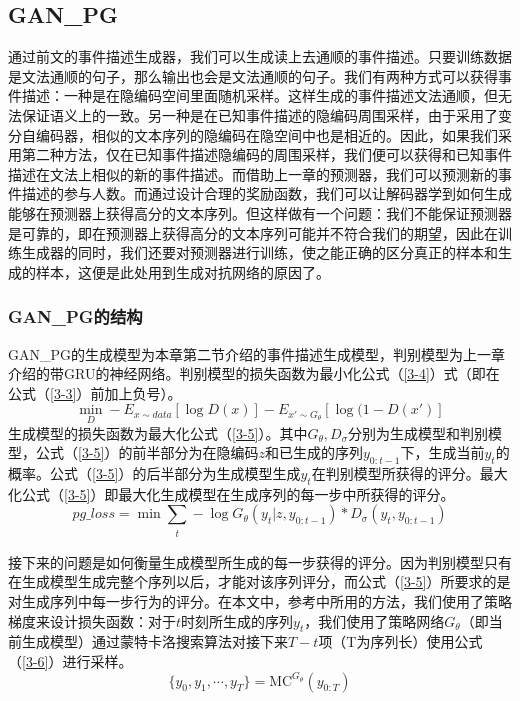 \subsection{GAN\_PG}
通过前文的事件描述生成器，我们可以生成读上去通顺的事件描述。只要训练数据是文法通顺的句子，那么输出也会是文法通顺的句子。我们有两种方式可以获得事件描述：一种是在隐编码空间里面随机采样。这样生成的事件描述文法通顺，但无法保证语义上的一致。另一种是在已知事件描述的隐编码周围采样，由于采用了变分自编码器，相似的文本序列的隐编码在隐空间中也是相近的。因此，如果我们采用第二种方法，仅在已知事件描述隐编码的周围采样，我们便可以获得和已知事件描述在文法上相似的新的事件描述。而借助上一章的预测器，我们可以预测新的事件描述的参与人数。而通过设计合理的奖励函数，我们可以让解码器学到如何生成能够在预测器上获得高分的文本序列。但这样做有一个问题：我们不能保证预测器是可靠的，即在预测器上获得高分的文本序列可能并不符合我们的期望，因此在训练生成器的同时，我们还要对预测器进行训练，使之能正确的区分真正的样本和生成的样本，这便是此处用到生成对抗网络的原因了。
\subsubsection{GAN\_PG的结构}
GAN\_PG的生成模型为本章第二节介绍的事件描述生成模型，判别模型为上一章介绍的带GRU的神经网络。判别模型的损失函数为最小化公式（\ref{3-4}）式（即在公式（\ref{3-3}）前加上负号）。
\begin{equation}\label{3-4}
    \mathop{min}_D-E_{x\sim data}[\log D(x)]-E_{x'\sim G_\theta}[\log(1-D(x')]
\end{equation}
生成模型的损失函数为最大化公式（\ref{3-5}）。其中$G_\theta,D_\sigma$分别为生成模型和判别模型，公式（\ref{3-5}）的前半部分为在隐编码$z$和已生成的序列$y_{0:t-1}$下，生成当前$y_t$的概率。公式（\ref{3-5}）的后半部分为生成模型生成$y_t$在判别模型所获得的评分。最大化公式（\ref{3-5}）即最大化生成模型在生成序列的每一步中所获得的评分。
\begin{equation}\label{3-5}
pg\_loss=\mathop{min}\sum_{\substack{t}}-\log G_\theta (y_t|z,y_{0:t-1})*D_\sigma (y_t,y_{0:t-1})
\end{equation}

接下来的问题是如何衡量生成模型所生成的每一步获得的评分。因为判别模型只有在生成模型生成完整个序列以后，才能对该序列评分，而公式（\ref{3-5}）所要求的是对生成序列中每一步行为的评分。在本文中，参考\cite{yu_seqgan:_2016}中所用的方法，我们使用了策略梯度来设计损失函数：对于$t$时刻所生成的序列$y_t$，我们使用了策略网络$G_\theta$（即当前生成模型）通过蒙特卡洛搜索算法对接下来$T-t$项（T为序列长）使用公式（\ref{3-6}）进行采样。
\begin{equation}\label{3-6}
    \{y_0,y_1,\dotsb,y_T\}=\mathrm{MC}^{G_\theta}(y_{0:T})
\end{equation}

